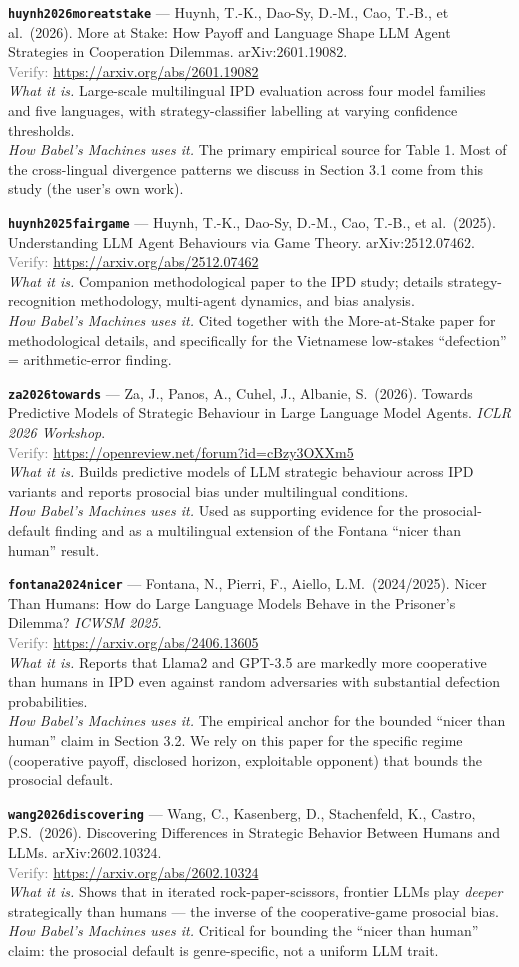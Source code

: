 \documentclass[11pt,a4paper]{article}
\newcommand{\entry}[5]{%
  \par\smallskip
  \noindent\textbf{\texttt{#1}} --- #2\\
  {\footnotesize \textcolor{gray}{Verify:} \url{#3}}\\
  \textit{What it is.} #4\\
  \textit{How Babel's Machines uses it.} #5
  \par\medskip
}
\begin{document}
\entry{huynh2026moreatstake}
{Huynh, T.-K., Dao-Sy, D.-M., Cao, T.-B., et al.\ (2026). More at Stake: How Payoff and Language Shape LLM Agent Strategies in Cooperation Dilemmas. arXiv:2601.19082.}
{https://arxiv.org/abs/2601.19082}
{Large-scale multilingual IPD evaluation across four model families and five languages, with strategy-classifier labelling at varying confidence thresholds.}
{The primary empirical source for Table 1. Most of the cross-lingual divergence patterns we discuss in Section 3.1 come from this study (the user's own work).}

\entry{huynh2025fairgame}
{Huynh, T.-K., Dao-Sy, D.-M., Cao, T.-B., et al.\ (2025). Understanding LLM Agent Behaviours via Game Theory. arXiv:2512.07462.}
{https://arxiv.org/abs/2512.07462}
{Companion methodological paper to the IPD study; details strategy-recognition methodology, multi-agent dynamics, and bias analysis.}
{Cited together with the More-at-Stake paper for methodological details, and specifically for the Vietnamese low-stakes ``defection'' = arithmetic-error finding.}

\entry{za2026towards}
{Za, J., Panos, A., Cuhel, J., Albanie, S.\ (2026). Towards Predictive Models of Strategic Behaviour in Large Language Model Agents. \emph{ICLR 2026 Workshop}.}
{https://openreview.net/forum?id=cBzy3OXXm5}
{Builds predictive models of LLM strategic behaviour across IPD variants and reports prosocial bias under multilingual conditions.}
{Used as supporting evidence for the prosocial-default finding and as a multilingual extension of the Fontana ``nicer than human'' result.}

\entry{fontana2024nicer}
{Fontana, N., Pierri, F., Aiello, L.M.\ (2024/2025). Nicer Than Humans: How do Large Language Models Behave in the Prisoner's Dilemma? \emph{ICWSM 2025}.}
{https://arxiv.org/abs/2406.13605}
{Reports that Llama2 and GPT-3.5 are markedly more cooperative than humans in IPD even against random adversaries with substantial defection probabilities.}
{The empirical anchor for the bounded ``nicer than human'' claim in Section 3.2. We rely on this paper for the specific regime (cooperative payoff, disclosed horizon, exploitable opponent) that bounds the prosocial default.}

\entry{wang2026discovering}
{Wang, C., Kasenberg, D., Stachenfeld, K., Castro, P.S.\ (2026). Discovering Differences in Strategic Behavior Between Humans and LLMs. arXiv:2602.10324.}
{https://arxiv.org/abs/2602.10324}
{Shows that in iterated rock-paper-scissors, frontier LLMs play \emph{deeper} strategically than humans --- the inverse of the cooperative-game prosocial bias.}
{Critical for bounding the ``nicer than human'' claim: the prosocial default is genre-specific, not a uniform LLM trait.}
\end{document}
